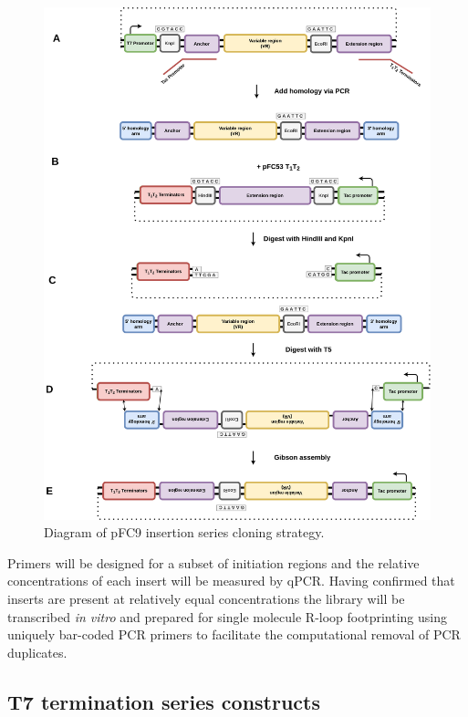 \documentclass[11pt]{article}
\begin{document}
\begin{figure}[H]
	\includegraphics[width=15cm]{images/cloning_diagrams/construct_diagrams-T7-Initiation-series.png}
	\centering
	\caption{Diagram of pFC9 insertion series cloning strategy.}
\end{figure}

Primers will be designed for a subset of initiation regions and the relative concentrations of each insert will be measured by qPCR. Having confirmed that inserts are present at relatively equal concentrations the library will be transcribed \emph{in vitro} and prepared for single molecule R-loop footprinting using uniquely bar-coded PCR primers to facilitate the computational removal of PCR duplicates. 


\subsection{T7 termination series constructs}
\end{document}
